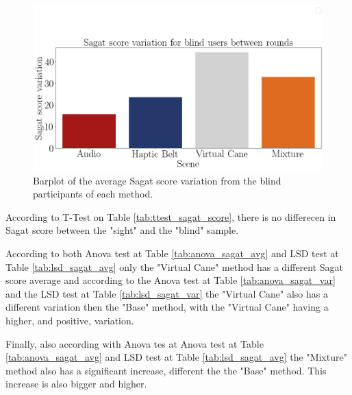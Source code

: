 \begin{figure}[!htb]
    \centering
    \includegraphics[width = 0.8\linewidth]{Resultados/Sagat/Figuras/png/barplot_sagat_var_scene_blind.png}
    \caption{Barplot of the average Sagat score variation from the blind participants of each method.}
    \label{fig:barplot_sagat_var_scene_blind}
\end{figure}

According to T-Test on Table \ref{tab:ttest_sagat_score}, there is no differecen in Sagat score between the "sight" and the "blind" sample.

According to both Anova test at Table \ref{tab:anova_sagat_avg} and LSD test at Table \ref{tab:lsd_sagat_avg} only the "Virtual Cane" method has a different Sagat score average and according to the Anova test at Table \ref{tab:anova_sagat_var} and the LSD test at Table \ref{tab:lsd_sagat_var} the "Virtual Cane" also has a different variation then the "Base" method, with the "Virtual Cane" having a higher, and positive, variation.

Finally, also according with Anova tes at Anova test at Table \ref{tab:anova_sagat_avg} and LSD test at Table \ref{tab:lsd_sagat_avg} the "Mixture" method also has a significant increase, different the the "Base" method. This increase is also bigger and higher.

\FloatBarrier
